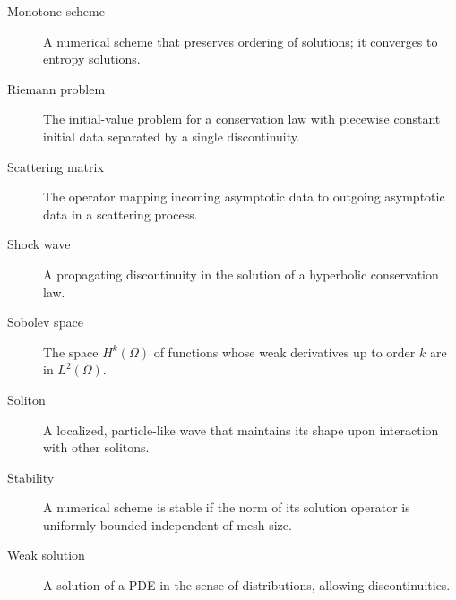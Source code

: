 \begin{description}
    \item[Monotone scheme] A numerical scheme that preserves ordering of solutions; it converges to entropy solutions.
    \item[Riemann problem] The initial-value problem for a conservation law with piecewise constant initial data separated by a single discontinuity.
    \item[Scattering matrix] The operator mapping incoming asymptotic data to outgoing asymptotic data in a scattering process.
    \item[Shock wave] A propagating discontinuity in the solution of a hyperbolic conservation law.
    \item[Sobolev space] The space \(H^k(\Omega)\) of functions whose weak derivatives up to order \(k\) are in \(L^2(\Omega)\).
    \item[Soliton] A localized, particle-like wave that maintains its shape upon interaction with other solitons.
    \item[Stability] A numerical scheme is stable if the norm of its solution operator is uniformly bounded independent of mesh size.
    \item[Weak solution] A solution of a PDE in the sense of distributions, allowing discontinuities.
\end{description}
